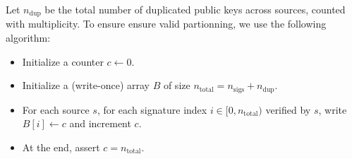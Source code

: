 \documentclass{article}
\theoremstyle{definition}
\begin{document}
Let $n_{\text{dup}}$ be the total number of duplicated public keys across sources, counted with multiplicity. To ensure ensure valid partionning, we use the following algorithm:

\begin{itemize}
    \item Initialize a counter $c \gets 0$.
    \item Initialize a (write-once) array $B$ of size $n_{\text{total}} = n_{\text{sigs}} + n_{\text{dup}}$.
    \item For each source $s$, for each signature index $i \in [0, n_{\text{total}})$ verified by $s$, write $B[i] \gets c$ and increment $c$.
    \item At the end, assert $c = n_{\text{total}}$.
\end{itemize}

\clearpage


\end{document}
